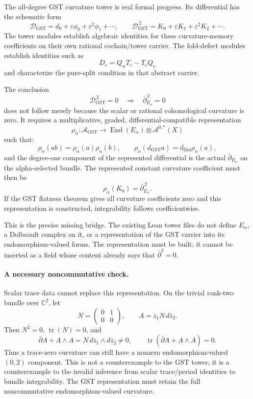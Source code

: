 The all-degree GST curvature tower is real formal progress. Its differential has the schematic form
\[
\mathcal D_{\mathrm{GST}}
=d_0+\varepsilon\phi_0+\varepsilon^2\phi_1+\cdots,
\qquad
\mathcal D_{\mathrm{GST}}^{\,2}
=K_0+\varepsilon K_1+\varepsilon^2K_2+\cdots.
\]
The tower modules establish algebraic identities for these curvature-memory coefficients on their own rational cochain/tower carrier. The fold-defect modules establish identities such as
\[
D_e=Q_wT_e-T_eQ_v
\]
and characterize the pure-split condition in that abstract carrier.

The conclusion
\[
\mathcal D_{\mathrm{GST}}^{\,2}=0
\quad\Longrightarrow\quad
\bar\partial_{E_\alpha}^{\,2}=0
\]
does not follow merely because the scalar or rational cohomological curvature is zero. It requires a multiplicative, graded, differential-compatible representation
\[
\rho_\alpha:
\mathcal A_{\mathrm{GST}}
\longrightarrow
\operatorname{End}(E_\alpha)\otimes
\mathcal A^{0,*}(X)
\]
such that:
\[
\rho_\alpha(ab)=\rho_\alpha(a)\rho_\alpha(b),
\qquad
\rho_\alpha(d_{\mathrm{GST}}a)
=d_{\mathrm{Dol}}\rho_\alpha(a),
\]
and the degree-one component of the represented differential is the actual
\(\bar\partial_{E_\alpha}\) on the alpha-selected bundle. The represented constant curvature coefficient must then be
\[
\rho_\alpha(K_0)=\bar\partial_{E_\alpha}^{\,2}.
\]
If the GST flatness theorem gives all curvature coefficients zero and this representation is constructed, integrability follows coefficientwise.

This is the precise missing bridge. The existing Lean tower files do not define \(E_\alpha\), a Dolbeault complex on it, or a representation of the GST carrier into its endomorphism-valued forms. The representation must be built; it cannot be inserted as a field whose content already says that \(\bar\partial^2=0\).

\paragraph{A necessary noncommutative check.}
Scalar trace data cannot replace this representation. On the trivial rank-two bundle over \(\mathbb C^2\), let
\[
N=\begin{pmatrix}0&1\\0&0\end{pmatrix},
\qquad
A=\bar z_1N\,d\bar z_2.
\]
Then \(N^2=0\), \(\operatorname{tr}(N)=0\), and
\[
\bar\partial A+A\wedge A
=
N\,d\bar z_1\wedge d\bar z_2\ne0,
\qquad
\operatorname{tr}(\bar\partial A+A\wedge A)=0.
\]
Thus a trace-zero curvature can still have a nonzero endomorphism-valued \((0,2)\) component. This is not a counterexample to the GST tower; it is a counterexample to the invalid inference from scalar trace/period identities to bundle integrability. The GST representation must retain the full noncommutative endomorphism-valued curvature.

